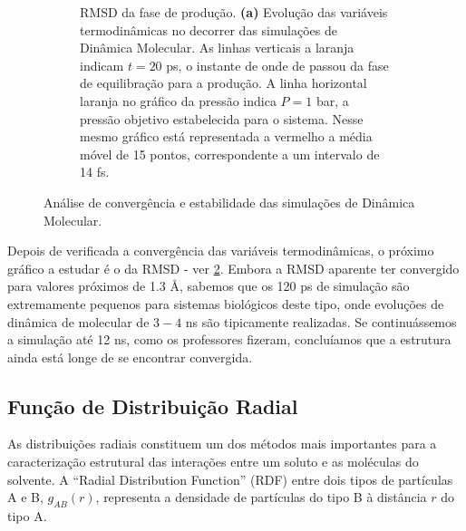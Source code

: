 \documentclass[12pt,a4paper]{article}
\begin{document}
\begin{figure}[h]
\begin{subfigure}[b]{0.48\textwidth}
		\caption{RMSD da fase de produção. \textbf{(a)} Evolução das variáveis termodinâmicas no decorrer das simulações de Dinâmica Molecular. As linhas verticais a laranja indicam $t=20$ ps, o instante de onde de passou da fase de equilibração para a produção. A linha horizontal laranja no gráfico da pressão indica $P = 1$ bar, a pressão objetivo estabelecida para o sistema. Nesse mesmo gráfico está representada a vermelho a média móvel de 15 pontos, correspondente a um intervalo de 14 fs.}
		\label{fig:an:rmsd}
	\end{subfigure}
	\caption{Análise de convergência e estabilidade das simulações de Dinâmica Molecular.}
	\end{figure}
	Depois de verificada a convergência das variáveis termodinâmicas, o próximo gráfico a estudar é o da RMSD - ver \cref{fig:an:rmsd}. Embora a RMSD aparente ter convergido para valores próximos de 1.3 \AA, sabemos que os 120 ps de simulação são extremamente pequenos para sistemas biológicos deste tipo, onde evoluções de dinâmica de molecular de $3-4$ ns são tipicamente realizadas. Se continuássemos a simulação até 12 ns, como os professores fizeram, concluíamos que a estrutura ainda está longe de se encontrar convergida.

\subsection{Função de Distribuição Radial}
	As distribuições radiais constituem um dos métodos mais importantes para a caracterização estrutural das interações entre um soluto e as moléculas do solvente. A ``Radial Distribution Function'' (RDF) entre dois tipos de partículas A e B, $g_{AB}(r)$, representa a densidade de partículas do tipo B à distância $r$ do tipo A.
	
\end{document}
